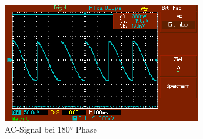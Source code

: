 \documentclass[captions=tableheading]{scrartcl}
\begin{document}
\begin{itemize}
            \begin{figure}
                \centering
                \includegraphics{Lock_In Bilder/Aufgabe 3/MAP005.pdf}
                \caption{AC-Signal bei 180° Phase}
                \label{fig:180sig2}
            \end{figure}
            \\
          

\end{itemize}
\end{document}
